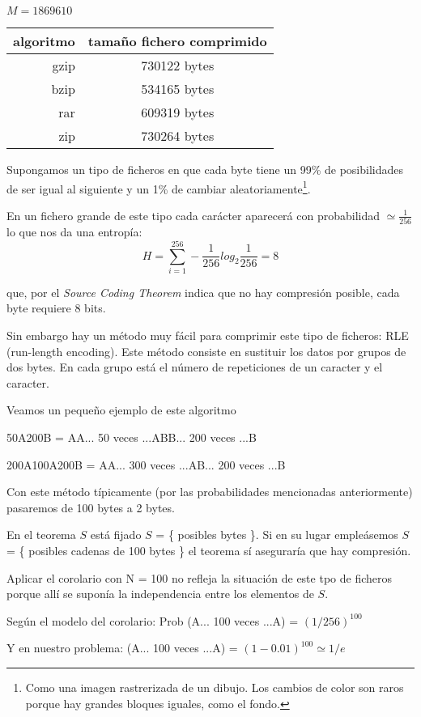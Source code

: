 	$M = 1869610$

	\begin{table}[h]
		\centering
		\begin{tabular}{r|c}
		algoritmo & tamaño fichero comprimido \\ \hline
		gzip & 730122 bytes \\
		bzip & 534165 bytes \\
		rar & 609319 bytes \\
		zip & 730264 bytes
		\end{tabular}
	\end{table}

	Supongamos un tipo de ficheros en que cada byte tiene un 99\% de posibilidades de ser igual al siguiente y un 1\% de cambiar aleatoriamente\footnote{Como una imagen rastrerizada de un dibujo. Los cambios de color son raros porque hay grandes bloques iguales, como el fondo.}.

	En un fichero grande de este tipo cada carácter aparecerá con probabilidad $\simeq \frac{1}{256}$ lo que nos da una entropía:
	\[H = \sum\limits^{256}_{i = 1} - \frac{1}{256} log_{2} \frac{1}{256} = 8\]

	que, por el \textit{Source Coding Theorem} indica que no hay compresión posible, cada byte requiere 8 bits.

	Sin embargo hay un método muy fácil para comprimir este tipo de ficheros: RLE (run-length encoding). Este método consiste en sustituir los datos por grupos de dos bytes. En cada grupo está el número de repeticiones de un caracter y el caracter.

	\begin{example}
	Veamos un pequeño ejemplo de este algoritmo

	50A200B = AA... 50 veces ...ABB... 200 veces ...B

	200A100A200B = AA... 300 veces ...AB... 200 veces ...B
	\end{example}

	Con este método típicamente (por las probabilidades mencionadas anteriormente) pasaremos de 100 bytes a 2 bytes.

	En el teorema $S$ está fijado $S$ = \{ posibles bytes \}. Si en su lugar empleásemos $S$ = \{ posibles cadenas de 100 bytes \} el teorema sí aseguraría que hay compresión.

	\begin{obs} Aplicar el corolario con N = 100 no refleja la situación de este tpo de ficheros porque allí se suponía la independencia entre los elementos de $S$.

	Según el modelo del corolario: Prob (A... 100 veces ...A) = $(1/256)^{100}$

	Y en nuestro problema: (A... 100 veces ...A) = $(1 - 0.01)^{100} \simeq{1/e}$

	\end{obs}

